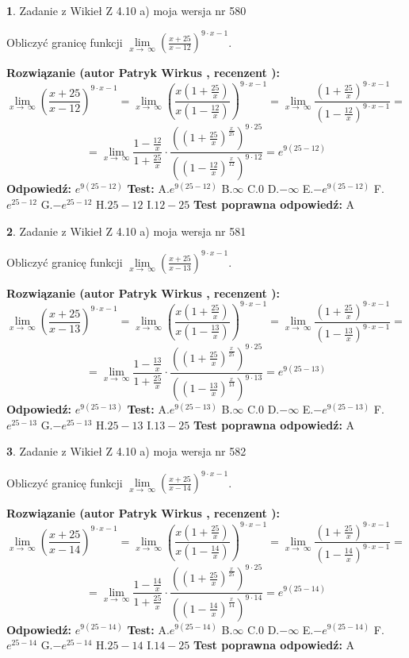 \documentclass[12pt, a4paper]{article}
\theoremstyle{definition} %
\newtheorem{zad}{}
\newcommand{\zadStart}[1]{\begin{zad}#1\newline}
\newcommand{\zadStop}{\end{zad}}
\newcommand{\rozwStart}[2]{\noindent \textbf{Rozwiązanie (autor #1 , recenzent #2): }\newline}
\newcommand{\rozwStop}{\newline}
\newcommand{\odpStart}{\noindent \textbf{Odpowiedź:}\newline}
\newcommand{\odpStop}{\newline}
\newcommand{\testStart}{\noindent \textbf{Test:}\newline}
\newcommand{\testStop}{\newline}
\newcommand{\kluczStart}{\noindent \textbf{Test poprawna odpowiedź:}\newline}
\newcommand{\kluczStop}{\newline}
\begin{document}
\zadStart{Zadanie z Wikieł Z 4.10 a) moja wersja nr 580}


Obliczyć granicę funkcji  $\lim\limits_{x\to\ \infty}(\frac{x+25}{x-12})^{9\cdot x-1}$.
\zadStop
\rozwStart{Patryk Wirkus}{}
$$\lim\limits_{x\to\ \infty}(\frac{x+25}{x-12})^{9\cdot x-1} = \lim\limits_{x\to\ \infty}(\frac{x(1+\frac{25}{x})}{x(1-\frac{12}{x})})^{9\cdot x-1}=\lim\limits_{x\to\ \infty}\frac{(1+\frac{25}{x})^{9\cdot x-1}}{(1-\frac{12}{x})^{9\cdot x-1}}=$$
$$=\lim\limits_{x\to\ \infty}\frac{1-\frac{12}{x}}{1+\frac{25}{x}}\cdot\frac{((1+\frac{25}{x})^{\frac{x}{25}})^{9\cdot25}}{((1-\frac{12}{x})^{\frac{x}{12}})^{9\cdot12}}=e^{9(25-12)}$$
\rozwStop
\odpStart
$e^{9(25-12)}$
\odpStop
\testStart
A.$e^{9(25-12)}$ B.$\infty$ C.$0$ D.$-\infty$ E.$-e^{9(25-12)}$
F.$e^{25-12}$ G.$-e^{25-12}$
H.$25-12$
I.$12-25$
\testStop
\kluczStart
A
\kluczStop



\zadStart{Zadanie z Wikieł Z 4.10 a) moja wersja nr 581}


Obliczyć granicę funkcji  $\lim\limits_{x\to\ \infty}(\frac{x+25}{x-13})^{9\cdot x-1}$.
\zadStop
\rozwStart{Patryk Wirkus}{}
$$\lim\limits_{x\to\ \infty}(\frac{x+25}{x-13})^{9\cdot x-1} = \lim\limits_{x\to\ \infty}(\frac{x(1+\frac{25}{x})}{x(1-\frac{13}{x})})^{9\cdot x-1}=\lim\limits_{x\to\ \infty}\frac{(1+\frac{25}{x})^{9\cdot x-1}}{(1-\frac{13}{x})^{9\cdot x-1}}=$$
$$=\lim\limits_{x\to\ \infty}\frac{1-\frac{13}{x}}{1+\frac{25}{x}}\cdot\frac{((1+\frac{25}{x})^{\frac{x}{25}})^{9\cdot25}}{((1-\frac{13}{x})^{\frac{x}{13}})^{9\cdot13}}=e^{9(25-13)}$$
\rozwStop
\odpStart
$e^{9(25-13)}$
\odpStop
\testStart
A.$e^{9(25-13)}$ B.$\infty$ C.$0$ D.$-\infty$ E.$-e^{9(25-13)}$
F.$e^{25-13}$ G.$-e^{25-13}$
H.$25-13$
I.$13-25$
\testStop
\kluczStart
A
\kluczStop



\zadStart{Zadanie z Wikieł Z 4.10 a) moja wersja nr 582}


Obliczyć granicę funkcji  $\lim\limits_{x\to\ \infty}(\frac{x+25}{x-14})^{9\cdot x-1}$.
\zadStop
\rozwStart{Patryk Wirkus}{}
$$\lim\limits_{x\to\ \infty}(\frac{x+25}{x-14})^{9\cdot x-1} = \lim\limits_{x\to\ \infty}(\frac{x(1+\frac{25}{x})}{x(1-\frac{14}{x})})^{9\cdot x-1}=\lim\limits_{x\to\ \infty}\frac{(1+\frac{25}{x})^{9\cdot x-1}}{(1-\frac{14}{x})^{9\cdot x-1}}=$$
$$=\lim\limits_{x\to\ \infty}\frac{1-\frac{14}{x}}{1+\frac{25}{x}}\cdot\frac{((1+\frac{25}{x})^{\frac{x}{25}})^{9\cdot25}}{((1-\frac{14}{x})^{\frac{x}{14}})^{9\cdot14}}=e^{9(25-14)}$$
\rozwStop
\odpStart
$e^{9(25-14)}$
\odpStop
\testStart
A.$e^{9(25-14)}$ B.$\infty$ C.$0$ D.$-\infty$ E.$-e^{9(25-14)}$
F.$e^{25-14}$ G.$-e^{25-14}$
H.$25-14$
I.$14-25$
\testStop
\kluczStart
A
\kluczStop
\end{document}
